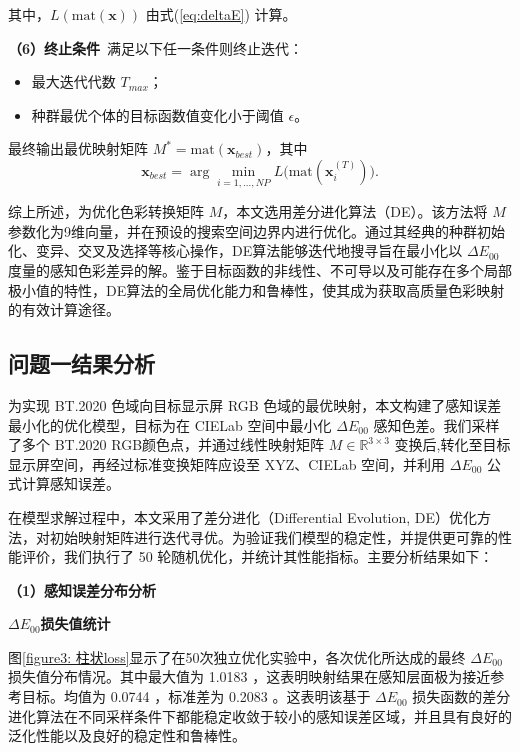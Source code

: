 其中，$L(\mathrm{mat}(\mathbf{x}))$ 由式(\ref{eq:deltaE}) 计算。

\noindent\textbf{（6）终止条件}\
满足以下任一条件则终止迭代：
\begin{itemize}
  \item 最大迭代代数 $T_{max}$；
  \item 种群最优个体的目标函数值变化小于阈值 $\epsilon$。
\end{itemize}

最终输出最优映射矩阵 $M^*=\mathrm{mat}(\mathbf{x}_{best})$，其中
\begin{equation}\label{eq:best_solution}
  \mathbf{x}_{best} = \arg\min_{i=1,\dots,NP} L\bigl(\mathrm{mat}(\mathbf{x}_i^{(T)})\bigr).
\end{equation}


综上所述，为优化色彩转换矩阵 $M$，本文选用差分进化算法（DE）。该方法将 $M$ 参数化为9维向量，并在预设的搜索空间边界内进行优化。通过其经典的种群初始化、变异、交叉及选择等核心操作，DE算法能够迭代地搜寻旨在最小化以 $\Delta E_{00}$ 度量的感知色彩差异的解。鉴于目标函数的非线性、不可导以及可能存在多个局部极小值的特性，DE算法的全局优化能力和鲁棒性，使其成为获取高质量色彩映射的有效计算途径。

\subsection[\hspace{-2pt}问题一结果分析]{{\heiti{} \hspace{-8pt}问题一结果分析}}\label{section4: 问题一结果分析}

为实现 BT.2020 色域向目标显示屏 RGB 色域的最优映射，本文构建了感知误差最小化的优化模型，目标为在 CIELab 空间中最小化 $\Delta E_{00}$ 感知色差。我们采样了多个 BT.2020 RGB颜色点，并通过线性映射矩阵 $M\in \mathbb{R}^{3\times 3}$ 变换后,转化至目标显示屏空间，再经过标准变换矩阵应设至 XYZ、CIELab 空间，并利用 $\Delta E_{00}$ 公式计算感知误差。

在模型求解过程中，本文采用了差分进化（Differential Evolution, DE）优化方法，对初始映射矩阵进行迭代寻优。为验证我们模型的稳定性，并提供更可靠的性能评价，我们执行了 50 轮随机优化，并统计其性能指标。主要分析结果如下：

\noindent\textbf{（1）感知误差分布分析}

 \textbf{$\Delta E_{00}$损失值统计}

图\ref{figure3: 柱状loss}显示了在50次独立优化实验中，各次优化所达成的最终 $\Delta E_{00}$ 损失值分布情况。其中最大值为 1.0183 ，这表明映射结果在感知层面极为接近参考目标。均值为 0.0744 ，标准差为 0.2083 。这表明该基于 $\Delta E_{00}$ 损失函数的差分进化算法在不同采样条件下都能稳定收敛于较小的感知误差区域，并且具有良好的泛化性能以及良好的稳定性和鲁棒性。

